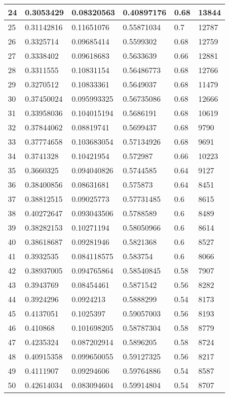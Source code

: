 \begin{longtable}{|l|l|l|l|l|l|}
24 & 0.3053429 & 0.08320563 & 0.40897176 & 0.68 & 13844 \\ \hline 
25 & 0.31142816 & 0.11651076 & 0.55871034 & 0.7 & 12787 \\ \hline 
26 & 0.3325714 & 0.09685414 & 0.5599302 & 0.68 & 12759 \\ \hline 
27 & 0.3338402 & 0.09618683 & 0.5633639 & 0.66 & 12881 \\ \hline 
28 & 0.3311555 & 0.10831154 & 0.56486773 & 0.68 & 12766 \\ \hline 
29 & 0.3270512 & 0.10833361 & 0.5649037 & 0.68 & 11479 \\ \hline 
30 & 0.37450024 & 0.095993325 & 0.56735086 & 0.68 & 12666 \\ \hline 
31 & 0.33958036 & 0.104015194 & 0.5686191 & 0.68 & 10619 \\ \hline 
32 & 0.37844062 & 0.08819741 & 0.5699437 & 0.68 & 9790 \\ \hline 
33 & 0.37774658 & 0.103683054 & 0.57134926 & 0.68 & 9691 \\ \hline 
34 & 0.3741328 & 0.10421954 & 0.572987 & 0.66 & 10223 \\ \hline 
35 & 0.3660325 & 0.094040826 & 0.5744585 & 0.64 & 9127 \\ \hline 
36 & 0.38400856 & 0.08631681 & 0.575873 & 0.64 & 8451 \\ \hline 
37 & 0.38812515 & 0.09025773 & 0.57731485 & 0.6 & 8615 \\ \hline 
38 & 0.40272647 & 0.093043506 & 0.5788589 & 0.6 & 8489 \\ \hline 
39 & 0.38282153 & 0.10271194 & 0.58050966 & 0.6 & 8614 \\ \hline 
40 & 0.38618687 & 0.09281946 & 0.5821368 & 0.6 & 8527 \\ \hline 
41 & 0.3932535 & 0.084118575 & 0.583754 & 0.6 & 8066 \\ \hline 
42 & 0.38937005 & 0.094765864 & 0.58540845 & 0.58 & 7907 \\ \hline 
43 & 0.3943769 & 0.08454461 & 0.5871542 & 0.56 & 8282 \\ \hline 
44 & 0.3924296 & 0.0924213 & 0.5888299 & 0.54 & 8173 \\ \hline 
45 & 0.4137051 & 0.1025397 & 0.59057003 & 0.56 & 8193 \\ \hline 
46 & 0.410868 & 0.101698205 & 0.58787304 & 0.58 & 8779 \\ \hline 
47 & 0.4235324 & 0.087202914 & 0.5896205 & 0.58 & 8724 \\ \hline 
48 & 0.40915358 & 0.099650055 & 0.59127325 & 0.56 & 8217 \\ \hline 
49 & 0.4111907 & 0.09294606 & 0.59764886 & 0.54 & 8587 \\ \hline 
50 & 0.42614034 & 0.083094604 & 0.59914804 & 0.54 & 8707 \\ \hline 
\end{longtable}